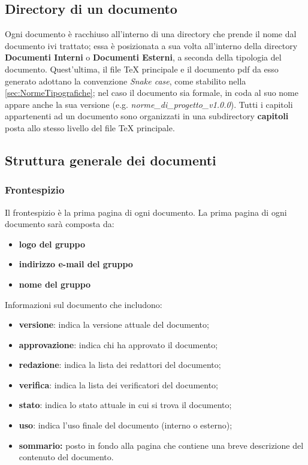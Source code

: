 \subsection{Directory di un documento}\label{ProcessiDiSupportoDocumentazioneDirectoryDiUnDocumento}
Ogni documento è racchiuso all'interno di una directory che prende il nome dal documento ivi trattato; essa è posizionata a sua volta all'interno della directory \textbf{Documenti Interni} o \textbf{Documenti Esterni}, a seconda della tipologia del documento. Quest'ultima, il file \TeX{} principale e il documento pdf da esso generato adottano la convenzione \textit{Snake case}, come stabilito nella \autoref{sec:NormeTipografiche}; nel caso il documento sia formale, in coda al suo nome appare anche la sua versione (e.g. \textit{norme\_di\_progetto\_v1.0.0}).
Tutti i capitoli appartenenti ad un documento sono organizzati in una subdirectory \textbf{capitoli} posta allo stesso livello del file \TeX{} principale.
\subsection{Struttura generale dei documenti}\label{ProcessiDiSupportoDocumentazioneStrutturaGeneraleDeiDocumenti}
\subsubsection{Frontespizio}\label{ProcessiDiSupportoDocumentazioneStrutturaGeneraleDeiDocumentiFrontespizio}
Il frontespizio è la prima pagina di ogni documento.
La prima pagina di ogni documento sarà composta da:
\begin{itemize}
	\item \textbf{logo del gruppo}
		\item \textbf{indirizzo e-mail del gruppo}
			\item \textbf{nome del gruppo}
\end{itemize}
Informazioni sul documento che includono:
\begin{itemize}
	\item \textbf{versione}: indica la versione attuale del documento;
		\item \textbf{approvazione}: indica chi ha approvato il documento;
			\item \textbf{redazione}: indica la lista dei redattori del documento;
				\item \textbf{verifica}: indica la lista dei verificatori del documento;
					\item \textbf{stato}: indica lo stato attuale in cui si trova il documento;
						\item \textbf{uso}: indica l’uso finale del documento (interno o esterno);
							\item \textbf{sommario:} posto in fondo alla pagina che contiene una breve descrizione del contenuto del documento.
\end{itemize}
